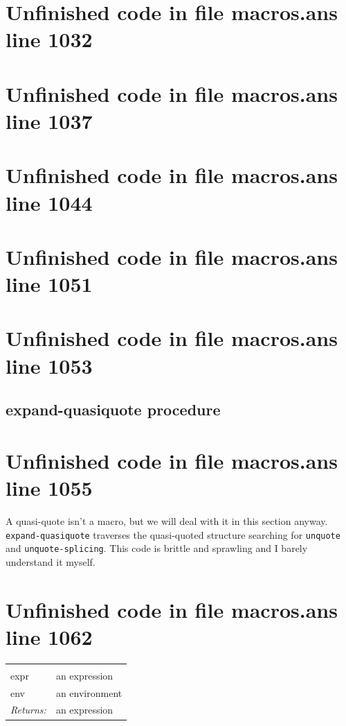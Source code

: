 \documentclass[twoside,9pt]{report}
\begin{document}
\section{Unfinished code in file macros.ans line 1032}
\section{Unfinished code in file macros.ans line 1037}
\section{Unfinished code in file macros.ans line 1044}
\section{Unfinished code in file macros.ans line 1051}
\section{Unfinished code in file macros.ans line 1053}
\subsection{expand-quasiquote procedure}
\label{expand-quasiquote-procedure}
\section{Unfinished code in file macros.ans line 1055}


A quasi-quote isn't a macro, but we will deal with it in this section anyway. \texttt{expand-quasiquote} traverses the quasi-quoted structure searching for \texttt{unquote} and \texttt{unquote-splicing}. This code is brittle and sprawling and I barely understand it myself.

\section{Unfinished code in file macros.ans line 1062}
\noindent\begin{tabular}{ |p{1.9cm} p{8cm}| }
\hline
\rowcolor[HTML]{CCCCCC} \multicolumn{2}{|l|}{\bf expand-quasiquote (internal)} \\
expr & an expression \\
env & an environment \\
\textit{Returns:} & an expression \\
\hline
\end{tabular}
\end{document}
